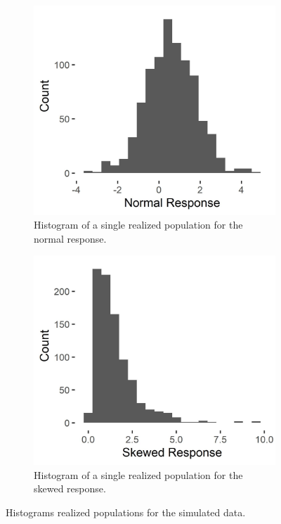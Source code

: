 \documentclass[]{elsarticle} %
\begin{document}
\begin{figure}
\centering
\begin{subfigure}{0.49\textwidth}
  \centering
  \includegraphics[width = 1\linewidth]{figures/symm_pop_hist.jpeg}
  \caption{Histogram of a single realized population for the normal response.}
  \label{fig:symm_pop_hist}
\end{subfigure}
\begin{subfigure}{0.49\textwidth}
  \centering
  \includegraphics[width = 1\linewidth]{figures/skew_pop_hist.jpeg}
  \caption{Histogram of a single realized population for the skewed response.}
  \label{fig:skew_pop_hist}
\end{subfigure}
\caption{Histograms realized populations for the simulated data.}
\label{fig:sim_pops}
\end{figure}
\end{document}
